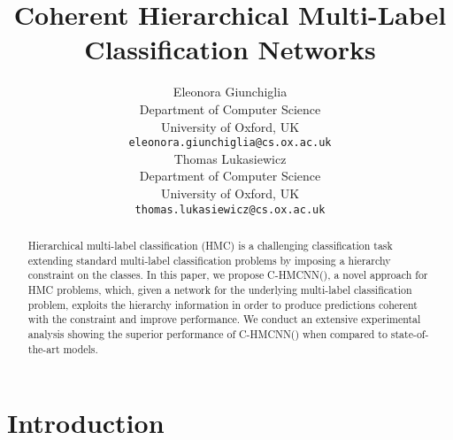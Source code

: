 \documentclass{article}
\title{Coherent Hierarchical Multi-Label\\ Classification Networks}
\author{Eleonora Giunchiglia  \\
  Department of Computer Science\\
  University of Oxford, UK\\
  \texttt{eleonora.giunchiglia@cs.ox.ac.uk} \\
   \And
   Thomas Lukasiewicz \\
   Department of Computer Science \\
   University of Oxford, UK \\
   \texttt{thomas.lukasiewicz@cs.ox.ac.uk} \\
}
\newcommand{\system}[1]{C-HMCNN(#1)}
\begin{document}
\maketitle


\begin{abstract}
Hierarchical multi-label classification (HMC) is a challenging classification task extending standard multi-label classification problems by imposing a hierarchy constraint on the classes. 
In this paper, we propose \system{}, a novel approach for HMC problems, which, given a network  for the underlying multi-label classification problem, exploits the hierarchy information in order to produce  predictions coherent with the constraint and improve performance. 
We conduct an extensive experimental analysis 
showing the superior performance of \system{} when compared to state-of-the-art models. 

\end{abstract}



\section{Introduction}
\end{document}
